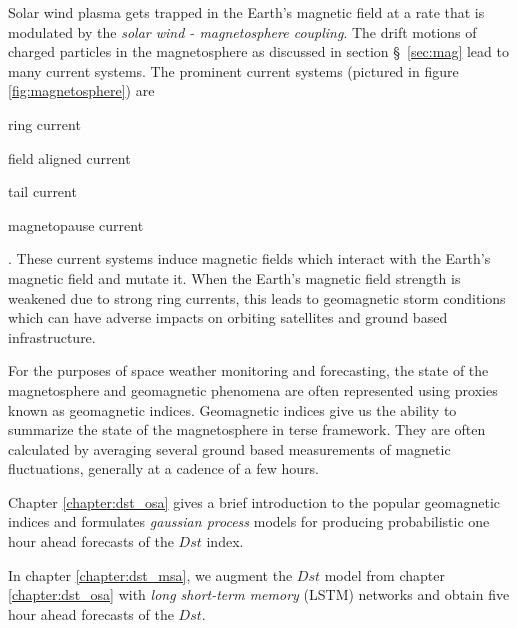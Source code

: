 Solar wind plasma gets trapped in the Earth's magnetic field at a rate that is modulated by the 
\emph{solar wind - magnetosphere coupling}. The drift motions of charged particles in the magnetosphere 
as discussed in section \S~\ref{sec:mag} lead to many current systems. The prominent current systems 
(pictured in figure \ref{fig:magnetosphere}) are \begin{enumerate*} \item ring current 
\item field aligned current \item tail current \item magnetopause current \end{enumerate*}.  
These current systems induce magnetic fields which interact with the Earth's magnetic field and mutate it. 
When the Earth's magnetic field strength is weakened due to strong ring currents, this leads to 
geomagnetic storm conditions which can have adverse impacts on orbiting satellites and ground based 
infrastructure.

For the purposes of space weather monitoring and forecasting, the state of the magnetosphere and geomagnetic 
phenomena are often represented using proxies known as geomagnetic indices. Geomagnetic indices give us the 
ability to summarize the state of the magnetosphere in terse framework. They are often calculated by averaging 
several ground based measurements of magnetic fluctuations, generally at a cadence of a few hours.

Chapter \ref{chapter:dst_osa} gives a brief introduction to the popular geomagnetic indices and formulates 
\emph{gaussian process} models for producing probabilistic one hour ahead forecasts of the $Dst$ 
index. 

In chapter \ref{chapter:dst_msa}, we augment the $Dst$ model from chapter \ref{chapter:dst_osa} with 
\emph{long short-term memory} (LSTM) networks and obtain five hour ahead forecasts of the $Dst$.



\clearpage

%
%
